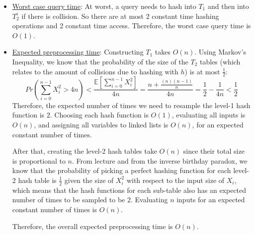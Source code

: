 \documentclass[11pt]{article}
\theoremstyle{definition}
\theoremstyle{remark}
\begin{document}
\begin{enumerate}
\begin{itemize}
\item \underline{Worst case query time}: At worst, a query needs to hash into $T_1$ and then into $T_2^i$ if there is collision. So there are at most 2 constant time hashing operations and 2 constant time access. Therefore, the worst case query time is $O(1)$.

\item \underline{Expected preprocessing time}: Constructing $T_1$ takes $O(n)$. Using Markov's Inequality, we know that the probability of the size of the $T_2$ tables (which relates to the amount of collisions due to hashing with $h$) is at most $\frac{1}{2}$:
\[
Pr\left(\sum_{i=0}^{n-1} X_i^2 > 4n\right) < \frac{\mathbb{E}\left[\sum_{i=0}^{n-1} X_i^2\right]}{4n} = \frac{n+\frac{(n)(n-1)}{n}}{4n} = \frac{1}{2}-\frac{1}{4n} < \frac{1}{2}
\]
Therefore, the expected number of times we need to resample the level-1 hash function is $2$. Choosing each hash function is $O(1)$, evaluating all inputs is $O(n)$, and assigning all variables to linked lists is $O(n)$, for an expected constant number of times.

After that, creating the level-2 hash tables take $O(n)$ since their total size is proportional to $n$. From lecture and from the inverse birthday paradox, we know that the probability of picking a perfect hashing function for each level-2 hash table is $\frac{1}{2}$ given the size of $X_i^2$ with respect to the input size of $X_i$, which means that the hash functions for each sub-table also has an expected number of times to be sampled to be $2$. Evaluating $n$ inputs for an expected constant number of times is $O(n)$.

Therefore, the overall expected preprocessing time is $O(n)$.
\end{itemize}
\end{enumerate}
\end{document}
